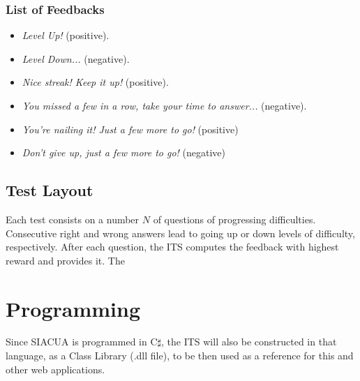 \documentclass{article}
\newcommand{\0}{\mathbbold{0}}
\newcommand{\1}{\mathds{1}}
\newcommand{\2}{\mathbbold{2}}
\begin{document}
\subsubsection{List of Feedbacks}
\begin{itemize}
    \item \textsl{Level Up!} (positive).
    \item \textsl{Level Down...} (negative).
    \item \textsl{Nice streak! Keep it up!} (positive).
    \item \textsl{You missed a few in a row, take your time to answer...} (negative).
    \item \textsl{You're nailing it! Just a few more to go!} (positive)
    \item \textsl{Don't give up, just a few more to go!} (negative)
\end{itemize}
\subsection{Test Layout}
Each test consists on a number $N$ of questions of progressing difficulties. Consecutive right and wrong answers lead to going up or down levels of difficulty, respectively.
After each question, the ITS computes the feedback with highest reward and provides it. The 

\section{Programming}
Since SIACUA is programmed in C$\sharp$, the ITS will also be constructed in that language, as a Class Library (.dll file), to be then used as a reference for this and other web applications.



\end{document}
